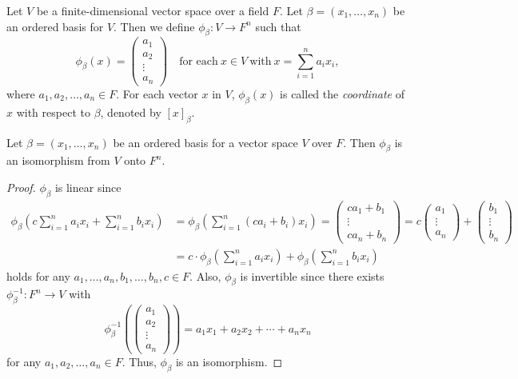 \begin{definition}
  \label{def:coordinate}
  Let $V$ be a finite-dimensional vector space over a field $F$.
  Let $\beta = (x_1, \dots, x_n)$ be an ordered basis for $V$.
  Then we define $\phi_\beta: V \to F^n$ such that
  \begin{equation*}
    \phi_\beta(x)
    = \begin{pmatrix} a_1 \\ a_2 \\ \vdots \\ a_n \end{pmatrix}
    \quad \text{for each}\ x \in V\ \text{with}\ x = \sum_{i=1}^n a_ix_i,
  \end{equation*}
  where $a_1, a_2, \dots, a_n \in F$.
  For each vector $x$ in $V$, $\phi_\beta(x)$ is called the \emph{coordinate}
  of $x$ with respect to $\beta$, denoted by $[x]_\beta$.
\end{definition}

\begin{proposition}
  \label{prop:coordinate}
  Let $\beta = (x_1, \dots, x_n)$ be an ordered basis for a vector space $V$
  over $F$.
  Then $\phi_\beta$ is an isomorphism from $V$ onto $F^n$.
\end{proposition}
\begin{proof}
  $\phi_\beta$ is linear since
  \begin{align*}
    \phi_\beta\left(c\sum_{i=1}^na_ix_i + \sum_{i=1}^nb_ix_i\right)
    &= \phi_\beta\left(\sum_{i=1}^n(ca_i + b_i)x_i\right)
     = \begin{pmatrix} ca_1 + b_1 \\ \vdots \\ ca_n + b_n \end{pmatrix}
     = c\begin{pmatrix} a_1 \\ \vdots \\ a_n \end{pmatrix}
       + \begin{pmatrix} b_1 \\ \vdots \\ b_n \end{pmatrix} \\
    &= c \cdot \phi_\beta\left(\sum_{i=1}^na_ix_i\right)
       + \phi_\beta\left(\sum_{i=1}^nb_ix_i\right)
  \end{align*}
  holds for any $a_1, \dots, a_n, b_1, \dots, b_n, c \in F$.
  Also, $\phi_\beta$ is invertible since there exists
  $\phi_\beta^{-1}: F^n \to V$ with
  \begin{equation*}
    \phi_\beta^{-1} \left(
      \begin{pmatrix} a_1 \\ a_2 \\ \vdots \\ a_n \end{pmatrix}
    \right)
    = a_1x_1 + a_2x_2 + \cdots + a_nx_n
  \end{equation*}
  for any $a_1, a_2, \dots, a_n \in F$.
  Thus, $\phi_\beta$ is an isomorphism.
\end{proof}

